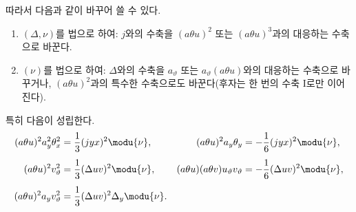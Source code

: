 
따라서 다음과 같이 바꾸어 쓸 수 있다.
\begingroup
\renewcommand{\labelenumi}{\arabic{enumi})}
\begin{enumerate}
\item $(\Delta,\nu)$를 법으로 하여: $j$와의 수축을 $(a\theta u)^2$ 또는 $(a\theta u)^3$과의 대응하는 수축으로 바꾼다.
\item $(\nu)$를 법으로 하여: $\Delta$와의 수축을 $a_\vartheta$ 또는 $a_\vartheta(a\theta u)$와의 대응하는 수축으로 바꾸거나, $(a\theta u)^2$과의 특수한 수축으로도 바꾼다(후자는 한 번의 수축 I로만 이어진다).
\end{enumerate}
\endgroup
특히 다음이 성립한다.
\[
\begin{aligned}
(a\theta u)^2a_y^2\theta_x^2&=\frac13(jyx)^2\modu{\nu},&
(a\theta u)^2a_y\theta_y&=-\frac16(jyx)^2\modu{\nu},\\[0.4em]
(a\theta u)^2v_\vartheta^2&=\frac13(\Delta uv)^2\modu{\nu},&
(a\theta u)(a\theta v)u_\vartheta v_\vartheta&=-\frac16(\Delta uv)^2\modu{\nu},\\[0.4em]
(a\theta u)^2a_yv_\vartheta^2&=\frac13(\Delta uv)^2\Delta_y\modu{\nu}.
\end{aligned}
\]
